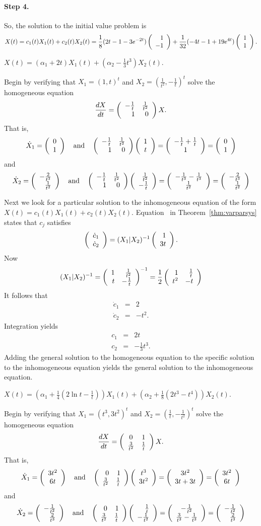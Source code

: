 \paragraph{Step 4.} So, the solution to the initial value problem is
\[
X(t) = c_1(t)X_1(t) + c_2(t)X_2(t)
= \frac{1}{8}(2t - 1 - 3e^{-2t})\left(\begin{array}{r} 1 \\ -1\end{array}\right) +
\frac{1}{32}(-4t - 1 + 19e^{4t})\left(\begin{array}{r} 1 \\ 1\end{array}\right).
\]


 \ans $X(t) = (\alpha_1+2t)X_1(t) + 
\left(\alpha_2-\frac{1}{3}t^3 \right)X_2(t)$.

\soln  Begin by verifying that $X_1=(1,t)^t$ and 
$X_2=(\frac{1}{t^2},-\frac{1}{t})^t$ solve the homogeneous
equation
\[
\frac{dX}{dt}= \left(\begin{array}{rr} -\frac{1}{t} & \frac{1}{t^2}\\ 1 &0\end{array}\right)X.
\]
That is,
\[
\dot{X}_1 = \left(\begin{array}{c} 0 \\ 1\end{array}\right) \quad\mbox{and}\quad 
\left(\begin{array}{rr} -\frac{1}{t} & \frac{1}{t^2}\\ 1 &0\end{array}\right)\left(\begin{array}{c} 1 \\ t\end{array}\right) = 
\left(\begin{array}{c} -\frac{1}{t}+\frac{1}{t} \\ 1\end{array}\right) = \left(\begin{array}{c} 0 \\ 1\end{array}\right)
\]
and 
\[
\dot{X}_2 = \left(\begin{array}{r} -\frac{2}{t^3} \\ \frac{1}{t^2}\end{array}\right) \quad\mbox{and}\quad 
\left(\begin{array}{rr} -\frac{1}{t} & \frac{1}{t^2}\\ 1 &0\end{array}\right)
\left(\begin{array}{r} \frac{1}{t^2} \\ -\frac{1}{t}\end{array}\right) = 
\left(\begin{array}{c} -\frac{1}{t^3}-\frac{1}{t^3} \\ \frac{1}{t^2}\end{array}\right) 
= \left(\begin{array}{r} -\frac{2}{t^3} \\ \frac{1}{t^2}\end{array}\right)
\]

Next we look for a particular solution to the inhomogeneous equation of 
the form $X(t)=c_1(t)X_1(t)+c_2(t)X_2(t)$.  Equation~ in
Theorem~\ref{thm:varparsys} states that $c_j$ satisfies
\[
\left(\begin{array}{r} \dot{c}_1 \\ \dot{c}_2\end{array}\right) = (X_1|X_2)^{-1} \left(\begin{array}{r} 1 \\ 3t\end{array}\right).
\]
Now 
\[
(X_1|X_2)^{-1} = \left(\begin{array}{rr} 1 & \frac{1}{t^2}\\ t &-\frac{1}{t}\end{array}\right)^{-1} = 
\frac{1}{2}\left(\begin{array}{rr} 1 & \frac{1}{t}\\ t^2 &-t\end{array}\right)
\]
It follows that 
\begin{eqnarray*}
\dot{c}_1 & = & 2 \\
\dot{c}_2 & = & -t^2.
\end{eqnarray*}
Integration yields
\begin{eqnarray*} 
c_1 & = & 2t\\
c_2 & = & -\frac{1}{3}t^3.
\end{eqnarray*}
Adding the general solution to the homogeneous equation to the specific
solution to the inhomogeneous equation yields the general solution to the
inhomogeneous equation.


\ans $X(t) = \left(\alpha_1+\frac{1}{4}\left(2\ln t -
\frac{1}{t}\right)\right)X_1(t) + \left(\alpha_2 + \frac{1}{8}
\left(2t^3-t^4\right)\right)X_2(t)$.

\soln  Begin by verifying that $X_1=(t^3,3t^2)^t$ and 
$X_2=(\frac{1}{t},-\frac{1}{t^2})^t$ solve the homogeneous
equation
\[
\frac{dX}{dt}= \left(\begin{array}{cc} 0 & 1\\ \frac{3}{t^2} &\frac{1}{t}\end{array}\right)X.
\]
That is,
\[
\dot{X}_1 = \left(\begin{array}{c} 3t^2 \\ 6t\end{array}\right) \quad\mbox{and}\quad 
\left(\begin{array}{rr} 0 & 1\\ \frac{3}{t^2} &\frac{1}{t}\end{array}\right)\left(\begin{array}{c} t^3 \\ 3t^2\end{array}\right) = 
\left(\begin{array}{c} 3t^2 \\ 3t+3t\end{array}\right) = \left(\begin{array}{c} 3t^2 \\ 6t\end{array}\right)
\]
and 
\[
\dot{X}_2 = \left(\begin{array}{r} -\frac{1}{t^2} \\ \frac{2}{t^3}\end{array}\right) \quad\mbox{and}\quad 
\left(\begin{array}{rr} 0 & 1\\ \frac{3}{t^2} &\frac{1}{t}\end{array}\right)
\left(\begin{array}{r} \frac{1}{t} \\ -\frac{1}{t^2}\end{array}\right) = 
\left(\begin{array}{c} -\frac{1}{t^2} \\ \frac{3}{t^3}-\frac{1}{t^3}\end{array}\right) 
= \left(\begin{array}{r} -\frac{1}{t^2} \\ \frac{2}{t^3}\end{array}\right)
\]

